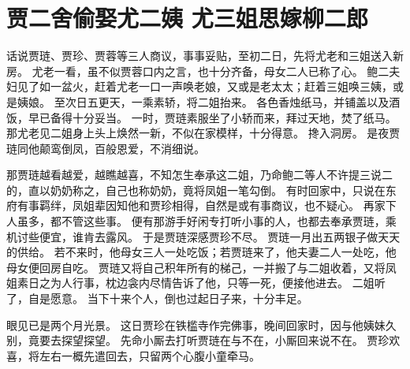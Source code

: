 \chapter{贾二舍偷娶尤二姨 \quad 尤三姐思嫁柳二郎}
\par
{}\par
话说贾琏、贾珍、贾蓉等三人商议，事事妥贴，至初二日，先将尤老和三姐送入新房。
尤老一看，虽不似贾蓉口内之言，也十分齐备，母女二人已称了心。
鲍二夫妇见了如一盆火，赶着尤老一口一声唤老娘，又或是老太太；赶着三姐唤三姨，或是姨娘。
至次日五更天，一乘素轿，将二姐抬来。
各色香烛纸马，并铺盖以及酒饭，早已备得十分妥当。
一时，贾琏素服坐了小轿而来，拜过天地，焚了纸马。
那尤老见二姐身上头上焕然一新，不似在家模样，十分得意。
搀入洞房。
是夜贾琏同他颠鸾倒凤，百般恩爱，不消细说。
\par
那贾琏越看越爱，越瞧越喜，不知怎生奉承这二姐，乃命鲍二等人不许提三说二的，直以奶奶称之，自己也称奶奶，竟将凤姐一笔勾倒。
有时回家中，只说在东府有事羁绊，凤姐辈因知他和贾珍相得，自然是或有事商议，也不疑心。
再家下人虽多，都不管这些事。
便有那游手好闲专打听小事的人，也都去奉承贾琏，乘机讨些便宜，谁肯去露风。
于是贾琏深感贾珍不尽。
贾琏一月出五两银子做天天的供给。
若不来时，他母女三人一处吃饭；若贾琏来了，他夫妻二人一处吃，他母女便回房自吃。
贾琏又将自己积年所有的梯己，一并搬了与二姐收着，又将凤姐素日之为人行事，枕边衾内尽情告诉了他，只等一死，便接他进去。
二姐听了，自是愿意。
当下十来个人，倒也过起日子来，十分丰足。
\par
眼见已是两个月光景。
这日贾珍在铁槛寺作完佛事，晚间回家时，因与他姨妹久别，竟要去探望探望。
先命小厮去打听贾琏在与不在，小厮回来说不在。
贾珍欢喜，将左右一概先遣回去，只留两个心腹小童牵马。
